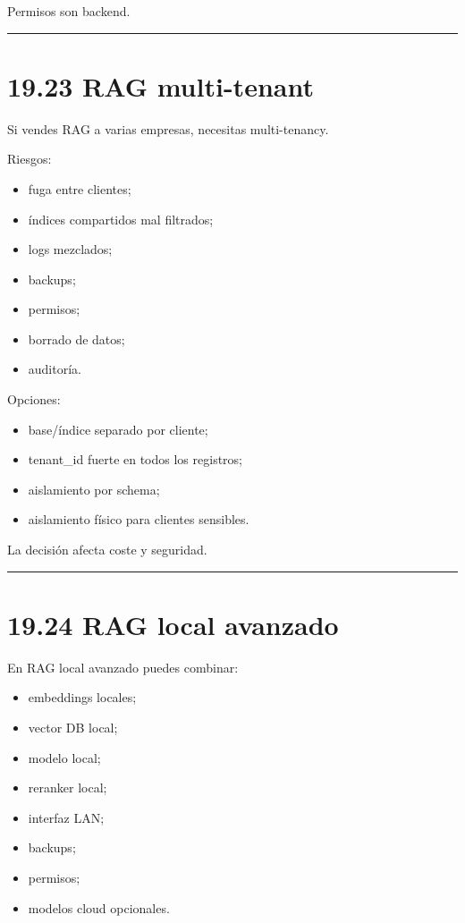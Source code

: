 Permisos son backend.

\begin{center}\rule{0.5\linewidth}{0.5pt}\end{center}

\section{19.23 RAG multi-tenant}\label{rag-multi-tenant}

Si vendes RAG a varias empresas, necesitas multi-tenancy.

Riesgos:

\begin{itemize}
\tightlist
\item
  fuga entre clientes;
\item
  índices compartidos mal filtrados;
\item
  logs mezclados;
\item
  backups;
\item
  permisos;
\item
  borrado de datos;
\item
  auditoría.
\end{itemize}

Opciones:

\begin{itemize}
\tightlist
\item
  base/índice separado por cliente;
\item
  tenant\_id fuerte en todos los registros;
\item
  aislamiento por schema;
\item
  aislamiento físico para clientes sensibles.
\end{itemize}

La decisión afecta coste y seguridad.

\begin{center}\rule{0.5\linewidth}{0.5pt}\end{center}

\section{19.24 RAG local avanzado}\label{rag-local-avanzado}

En RAG local avanzado puedes combinar:

\begin{itemize}
\tightlist
\item
  embeddings locales;
\item
  vector DB local;
\item
  modelo local;
\item
  reranker local;
\item
  interfaz LAN;
\item
  backups;
\item
  permisos;
\item
  modelos cloud opcionales.
\end{itemize}

